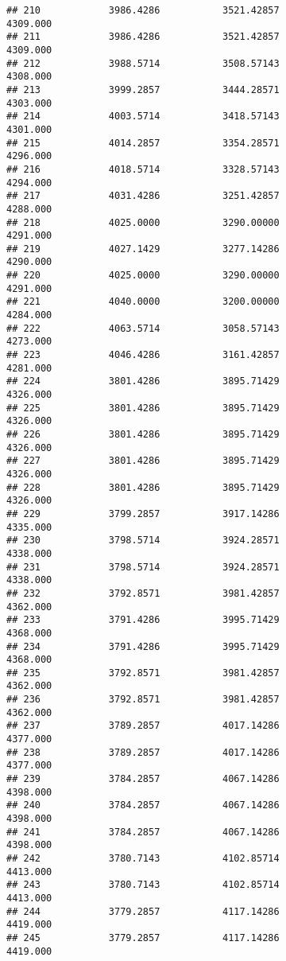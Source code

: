 \documentclass[]{article}
\begin{document}
\begin{verbatim}
## 210            3986.4286           3521.42857                4309.000
## 211            3986.4286           3521.42857                4309.000
## 212            3988.5714           3508.57143                4308.000
## 213            3999.2857           3444.28571                4303.000
## 214            4003.5714           3418.57143                4301.000
## 215            4014.2857           3354.28571                4296.000
## 216            4018.5714           3328.57143                4294.000
## 217            4031.4286           3251.42857                4288.000
## 218            4025.0000           3290.00000                4291.000
## 219            4027.1429           3277.14286                4290.000
## 220            4025.0000           3290.00000                4291.000
## 221            4040.0000           3200.00000                4284.000
## 222            4063.5714           3058.57143                4273.000
## 223            4046.4286           3161.42857                4281.000
## 224            3801.4286           3895.71429                4326.000
## 225            3801.4286           3895.71429                4326.000
## 226            3801.4286           3895.71429                4326.000
## 227            3801.4286           3895.71429                4326.000
## 228            3801.4286           3895.71429                4326.000
## 229            3799.2857           3917.14286                4335.000
## 230            3798.5714           3924.28571                4338.000
## 231            3798.5714           3924.28571                4338.000
## 232            3792.8571           3981.42857                4362.000
## 233            3791.4286           3995.71429                4368.000
## 234            3791.4286           3995.71429                4368.000
## 235            3792.8571           3981.42857                4362.000
## 236            3792.8571           3981.42857                4362.000
## 237            3789.2857           4017.14286                4377.000
## 238            3789.2857           4017.14286                4377.000
## 239            3784.2857           4067.14286                4398.000
## 240            3784.2857           4067.14286                4398.000
## 241            3784.2857           4067.14286                4398.000
## 242            3780.7143           4102.85714                4413.000
## 243            3780.7143           4102.85714                4413.000
## 244            3779.2857           4117.14286                4419.000
## 245            3779.2857           4117.14286                4419.000

\end{verbatim}
\end{document}
